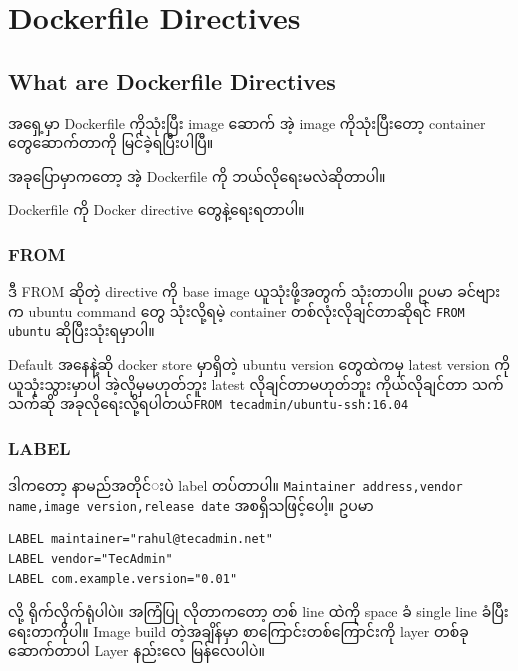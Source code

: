 \documentclass{article}
\begin{document}
\pagebreak

\section{Dockerfile Directives}\label{dockerfile-directives}

\subsection{What are Dockerfile
Directives}\label{what-are-dockerfile-directives}

အ​ရှေ့မှာ Dockerfile ကိုသုံးပြီး image ​ဆောက်​ အဲ့ image
ကိုသုံးပြီး​တော့ container ​တွေ ​ဆောက်​တာကို မြင်​ခဲ့ရပြီးပါပြီ။

အခု​ပြောမှာက​တော့ အဲ့ Dockerfile ကို ဘယ်​လို​ရေးမလဲဆိုတာပါ။

Dockerfile ကို Docker directive ​တွေနဲ့​ရေးရတာပါ။

\subsubsection{FROM}\label{from}

ဒီ FROM ဆိုတဲ့ directive ကို base image ယူသုံးဖို့အတွက်​ သုံးတာပါ။ ဥပမာ
ခင်​​ဗျားက ubuntu command ​တွေ သုံးလို့ရမဲ့ container
တစ်​လုံးလိုချင်​တာဆိုရင်​ \texttt{FROM ubuntu} ဆိုပြီးသုံးရမှာပါ။

Default အ​နေနဲ့ဆို docker store မှာရှိတဲ့ ubuntu version ​တွေထဲကမှ
latest version ကို ယူသုံးသွားမှာပါ အဲ့လိုမှမဟုတ်​ဘူး latest
လိုချင်​တာမဟုတ်​ဘူး ကိုယ်​လိုချင်​တာ သက်​သက်​ဆို အခုလို​ရေးလို့ရပါတယ်​
\texttt{FROM tecadmin/ubuntu-ssh:16.04}

\subsubsection{LABEL}\label{label}

ဒါက​တော့ နာမည်​အတိုင်​းပဲ label တပ်​တာပါ။
\texttt{Maintainer addres​s,vendor name,image version,release date}
အစရှိသဖြင့်​ပေါ့။ ဥပမာ

\begin{verbatim}
LABEL maintainer="rahul@tecadmin.net"
LABEL vendor="TecAdmin"
LABEL com.example.version="0.01"
\end{verbatim}

လို့ ရိုက်​လိုက်​ရုံပါပဲ။ အကြံပြု လိုတာက​တော့ တစ်​ line ထဲကို space ခံ
single line ခံပြီး ​ရေးတာကိုပါ။ Image build တဲ့အချိန်​မှာ
စာ​ကြောင်းတစ်​​ကြောင်းကို layer တစ်​ခု ​ဆောက်​တာပါ Layer နည်း​လေ
မြန်​​လေပါပဲ။
\end{document}
